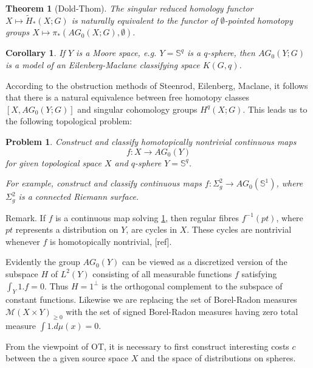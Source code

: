 \documentclass[12pt]{amsart}
\newtheorem*{thm}{Theorem}
\newtheorem{prob}{Problem}
\newtheorem*{cor}{Corollary}
\theoremstyle{definition}
\theoremstyle{remark}
\newcommand{\bZ}{\mathbb{Z}}
\begin{document}
\begin{thm}[Dold-Thom]
The singular reduced homology functor $X\mapsto \tilde{H}_*(X;G)$ is naturally equivalent to the functor of $\emptyset$-pointed homotopy groups $X\mapsto \pi_*(AG_0(X;G), \emptyset)$.
\end{thm}

\begin{cor}
If $Y$ is a Moore space, e.g. $Y=\mathbb{S}^q$ is a $q$-sphere, then $AG_0(Y;G)$ is a model of an Eilenberg-Maclane classifying space $K(G,q)$.
\end{cor}

According to the obstruction methods of Steenrod, Eilenberg, Maclane, it follows that there is a natural equivalence between free homotopy classes $[X, AG_0(Y;G)]$ and singular cohomology groups $H^q(X;G)$. This leads us to the following topological problem: 

\begin{prob}
\label{dt1}
Construct and classify homotopically nontrivial continuous maps $$f: X \to AG_0(Y)$$ for given topological space $X$ and $q$-sphere $Y=\mathbb{S}^q$.

For example, construct and classify continuous maps $f: \Sigma^2_g \to AG_0(\mathbb{S}^1)$, where $\Sigma_g^2$ is a connected Riemann surface.
\end{prob}

Remark. If $f$ is a continuous map solving \ref{dt1}, then regular fibres $f^{-1}(pt)$, where $pt$ represents a distribution on $Y$, are cycles in $X$. These cycles are nontrivial whenever $f$ is homotopically nontrivial, [ref].



Evidently the group $AG_0(Y)$ can be viewed as a discretized version of the subspace $H$ of $L^2(Y)$ consisting of all measurable functions $f$ satisfying $\int_Y 1. f=0$. Thus $H=1^{\perp}$ is the orthogonal complement to the subspace of constant functions. Likewise we are replacing the set of Borel-Radon measures $\mathscr{M}(X\times Y)_{\geq 0}$ with the set of signed Borel-Radon measures having zero total measure $\int 1. d\mu(x) =0$.

From the viewpoint of OT, it is necessary to first construct interesting costs $c$ between the a given source space $X$ and the space of distributions on spheres.
\end{document}
